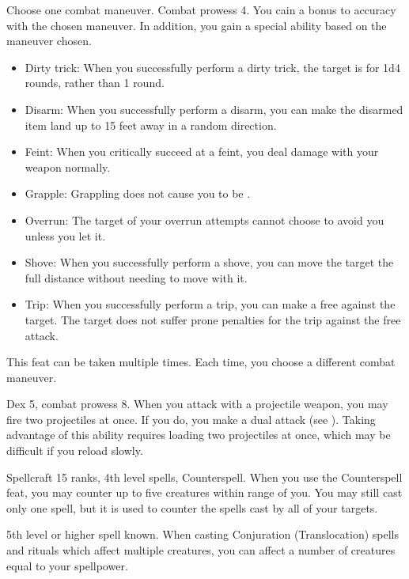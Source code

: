 Choose one combat maneuver.
\featpre Combat prowess 4.
\featben You cain a  bonus to accuracy with the chosen maneuver.
In addition, you gain a special ability based on the maneuver chosen.
\begin{itemize}
    \item Dirty trick: When you successfully perform a dirty trick, the target is \impaired for 1d4 rounds, rather than 1 round.
    \item Disarm: When you successfully perform a disarm, you can make the disarmed item land up to 15 feet away in a random direction.
    \item Feint: When you critically succeed at a feint, you deal damage with your weapon normally.
    \item Grapple: Grappling does not cause you to be .
    \item Overrun: The target of your overrun attempts cannot choose to avoid you unless you let it.
    \item Shove: When you successfully perform a shove, you can move the target the full distance without needing to move with it.
    \item Trip: When you successfully perform a trip, you can make a free  against the target. The target does not suffer prone penalties for the trip against the free attack.
\end{itemize}
 This feat can be taken multiple times.
Each time, you choose a different combat maneuver.

\featpres Dex 5, combat prowess 8.
\featben When you attack with a projectile weapon, you may fire two projectiles at once.
If you do, you make a dual attack (see ).
Taking advantage of this ability requires loading two projectiles at once, which may be difficult if you reload slowly.

\featpres Spellcraft 15 ranks, 4th level spells, Counterspell.
\featben When you use the Counterspell feat, you may counter up to five creatures within \rngmed range of you.
You may still cast only one spell, but it is used to counter the spells cast by all of your targets.

\featpre 5th level or higher  spell known.
\featben When casting Conjuration (Translocation) spells and rituals which affect multiple creatures, you can affect a number of creatures equal to your spellpower.

